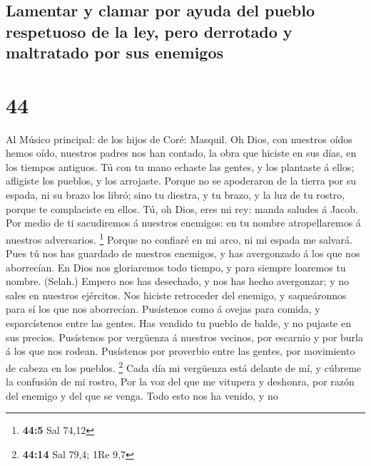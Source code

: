 \hypertarget{lamentar-y-clamar-por-ayuda-del-pueblo-respetuoso-de-la-ley-pero-derrotado-y-maltratado-por-sus-enemigos}{%
\subsection{Lamentar y clamar por ayuda del pueblo respetuoso de la ley,
pero derrotado y maltratado por sus
enemigos}\label{lamentar-y-clamar-por-ayuda-del-pueblo-respetuoso-de-la-ley-pero-derrotado-y-maltratado-por-sus-enemigos}}

\hypertarget{section-43}{%
\section{44}\label{section-43}}

 Al Músico principal: de los hijos de Coré: Masquil. Oh
Dios, con nuestros oídos hemos oído, nuestros padres nos han contado, la
obra que hiciste en sus días, en los tiempos antiguos.  Tú
con tu mano echaste las gentes, y los plantaste á ellos; afligiste los
pueblos, y los arrojaste.  Porque no se apoderaron de la
tierra por su espada, ni su brazo los libró; sino tu diestra, y tu
brazo, y la luz de tu rostro, porque te complaciste en ellos.
 Tú, oh Dios, eres mi rey: manda saludes á Jacob.
 Por medio de ti sacudiremos á nuestros enemigos: en tu
nombre atropellaremos á nuestros adversarios. \footnote{\textbf{44:5}
  Sal 74,12}  Porque no confiaré en mi arco, ni mi espada me
salvará.  Pues tú nos has guardado de nuestros enemigos, y
has avergonzado á los que nos aborrecían.  En Dios nos
gloriaremos todo tiempo, y para siempre loaremos tu nombre. (Selah.)
 Empero nos has desechado, y nos has hecho avergonzar; y no
sales en nuestros ejércitos.  Nos hiciste retroceder del
enemigo, y saqueáronnos para sí los que nos aborrecían. 
Pusístenos como á ovejas para comida, y esparcístenos entre las gentes.
 Has vendido tu pueblo de balde, y no pujaste en sus
precios.  Pusístenos por vergüenza á nuestros vecinos, por
escarnio y por burla á los que nos rodean.  Pusístenos por
proverbio entre las gentes, por movimiento de cabeza en los pueblos.
\footnote{\textbf{44:14} Sal 79,4; 1Re 9,7}  Cada día mi
vergüenza está delante de mí, y cúbreme la confusión de mi rostro,
 Por la voz del que me vitupera y deshonra, por razón del
enemigo y del que se venga.  Todo esto nos ha venido, y no
